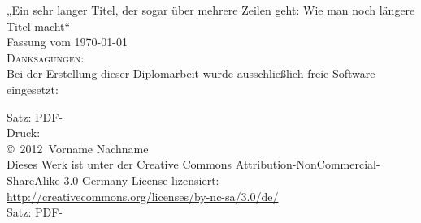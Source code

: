 \documentclass[a4paper,10pt,bibtotoc,twoside,openright,pointlessnumbers,normalheadings,DIV=9
]{scrbook}
\newcommand{\fullname}{Vorname Nachname}
\newcommand{\titel}{Ein sehr langer Titel, der sogar über mehrere Zeilen geht: Wie man noch längere Titel macht}
\newcommand{\jahr}{2012}
\begin{document}
\clearpage
\thispagestyle{empty}
{ \small
  \flushleft
  „\titel“\\
  Fassung vom \today \\ \vfill
  \textsc{Danksagungen:}  \\ \vspace{1cm}
  Bei der Erstellung dieser Diplomarbeit wurde ausschließlich freie Software eingesetzt: \\
  \begin{figure}[ht]
  	\hspace{0.5cm} 
  	\hspace{0.5cm} 
  	\hspace{0.5cm} 
  	\hspace{0.5cm} 
  	\hspace{0.5cm} 
  	\hspace{0.5cm} 
  \end{figure}  
  
  \vspace{1cm}
  Satz: PDF-\LaTeXe \\
  Druck:  \\ \vspace{1cm}
  \copyright~\jahr~\fullname\\[0.5em]
Dieses Werk ist unter der Creative Commons Attribution-NonCommercial-ShareAlike 3.0 Germany License lizensiert: \url{http://creativecommons.org/licenses/by-nc-sa/3.0/de/}\\
  Satz: PDF-\LaTeXe
}



\tableofcontents

\mainmatter



\appendix

\end{document}
